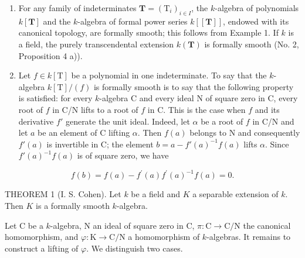 \begin{enumerate}
\def\labelenumi{\arabic{enumi})}
\setcounter{enumi}{1}
\item
  For any family of indeterminates \(\mathbf{T} = (\mathrm{T}_i)_{i\in I}\), the \(k\)-algebra of polynomials \(k[\mathbf{T}]\) and the \(k\)-algebra of formal power series \(k[[\mathbf{T}]]\), endowed with its canonical topology, are formally smooth; this follows from Example 1. If \(k\) is a field, the purely transcendental extension \(k(\mathbf{T})\) is formally smooth (No. 2, Proposition 4 a)).
\item
  Let \(f \in k[\mathrm{T}]\) be a polynomial in one indeterminate. To say that the \(k\)-algebra \(k[\mathrm{T}]/(f)\) is formally smooth is to say that the following property is satisfied: for every \(k\)-algebra C and every ideal N of square zero in C, every root of \(f\) in C/N lifts to a root of \(f\) in C. This is the case when \(f\) and its derivative \(f'\) generate the unit ideal. Indeed, let \(\alpha\) be a root of \(f\) in C/N and let \(a\) be an element of C lifting \(\alpha\). Then \(f(a)\) belongs to N and consequently \(f'(a)\) is invertible in C; the element \(b = a - f'(a)^{-1}f(a)\) lifts \(\alpha\). Since \(f'(a)^{-1}f(a)\) is of square zero, we have
\end{enumerate}

\[
f (b) = f (a) - f ^ {\prime} (a) f ^ {\prime} (a) ^ {- 1} f (a) = 0.
\]

THEOREM 1 (I. S. Cohen). Let \(k\) be a field and \(K\) a separable extension of \(k\). Then \(K\) is a formally smooth \(k\)-algebra.

Let C be a \(k\)-algebra, N an ideal of square zero in C, \(\pi: \mathrm{C} \to \mathrm{C/N}\) the canonical homomorphism, and \(\varphi: \mathrm{K} \to \mathrm{C/N}\) a homomorphism of \(k\)-algebras. It remains to construct a lifting of \(\varphi\). We distinguish two cases.


